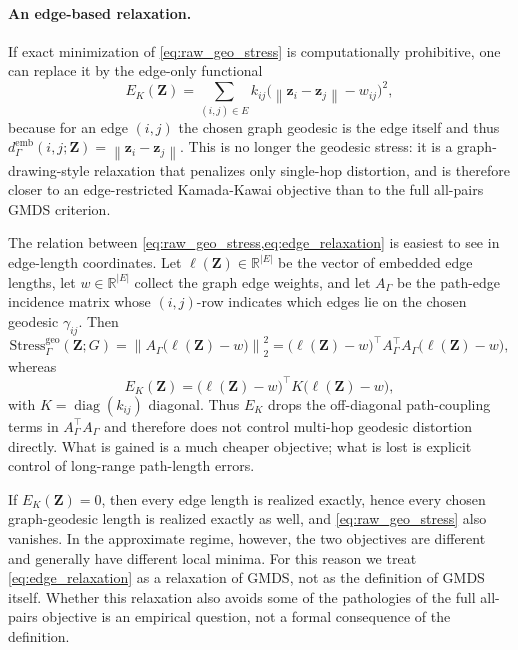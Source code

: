 \documentclass[11pt]{article}
\newcommand{\R}{\mathbb{R}}
\newcommand{\bz}{\mathbf{z}}
\newcommand{\bZ}{\mathbf{Z}}
\newcommand{\norm}[1]{\left\|#1\right\|}
\newcommand{\demb}{d^{\mathrm{emb}}}
\newcommand{\Stress}{\mathrm{Stress}}
\newcommand{\diag}{\operatorname{diag}}
\theoremstyle{definition}
\theoremstyle{plain}
\theoremstyle{remark}
\begin{document}
\paragraph{An edge-based relaxation.}
If exact minimization of \cref{eq:raw_geo_stress} is computationally
prohibitive, one can replace it by the edge-only functional
\begin{equation}
  E_K(\bZ)
  = \sum_{(i,j) \in E} k_{ij}\bigl(\norm{\bz_i - \bz_j} - w_{ij}\bigr)^2,
  \label{eq:edge_relaxation}
\end{equation}
because for an edge $(i,j)$ the chosen graph geodesic is the edge itself and
thus $\demb_{\Gamma}(i,j;\bZ) = \norm{\bz_i - \bz_j}$.  This is no longer the
geodesic stress: it is a graph-drawing-style relaxation that penalizes only
single-hop distortion, and is therefore closer to an edge-restricted
Kamada-Kawai objective \citep{kamada1989algorithm, fruchterman1991graph}
than to the full all-pairs GMDS criterion.

The relation between \cref{eq:raw_geo_stress,eq:edge_relaxation} is easiest to
see in edge-length coordinates.  Let $\ell(\bZ) \in \R^{|E|}$ be the vector of
embedded edge lengths, let $w \in \R^{|E|}$ collect the graph edge weights, and
let $A_{\Gamma}$ be the path-edge incidence matrix whose $(i,j)$-row indicates
which edges lie on the chosen geodesic $\gamma_{ij}$.  Then
\begin{equation}
  \Stress^{\mathrm{geo}}_{\Gamma}(\bZ; G)
  = \norm{A_{\Gamma}\bigl(\ell(\bZ) - w\bigr)}_2^2
  = \bigl(\ell(\bZ)-w\bigr)^\top
    A_{\Gamma}^\top A_{\Gamma}
    \bigl(\ell(\bZ)-w\bigr),
  \label{eq:path_incidence_stress}
\end{equation}
whereas
\begin{equation}
  E_K(\bZ)
  = \bigl(\ell(\bZ)-w\bigr)^\top K \bigl(\ell(\bZ)-w\bigr),
  \label{eq:edge_relaxation_matrix}
\end{equation}
with $K = \diag(k_{ij})$ diagonal.  Thus $E_K$ drops the off-diagonal
path-coupling terms in $A_{\Gamma}^\top A_{\Gamma}$ and therefore does not
control multi-hop geodesic distortion directly.  What is gained is a much
cheaper objective; what is lost is explicit control of long-range path-length
errors.

If $E_K(\bZ) = 0$, then every edge length is realized exactly, hence every
chosen graph-geodesic length is realized exactly as well, and
\cref{eq:raw_geo_stress} also vanishes.  In the approximate regime, however,
the two objectives are different and generally have different local minima.
For this reason we treat \cref{eq:edge_relaxation} as a relaxation of GMDS,
not as the definition of GMDS itself.  Whether this relaxation also avoids
some of the pathologies of the full all-pairs objective is an empirical
question, not a formal consequence of the definition.
\end{document}
